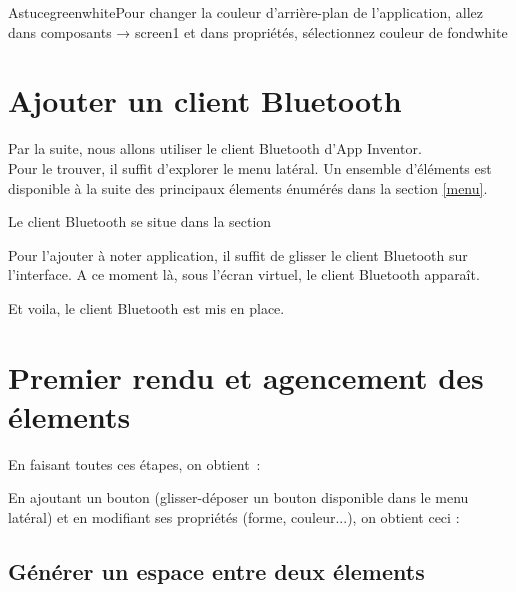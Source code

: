 \begin{messageBox}{Astuce}{green}{white}{Pour changer la couleur d'arrière-plan de l'application, allez dans composants → screen1 et dans propriétés, sélectionnez couleur de fond}{white}
\end{messageBox}

\section{Ajouter un client Bluetooth} \label{bluetooth_install}

Par la suite, nous allons utiliser le client Bluetooth d'App Inventor. \\
Pour le trouver, il suffit d'explorer le {\color{orange}menu latéral}. Un ensemble d'éléments est disponible à la suite des principaux élements énumérés dans la section \ref{menu}.


Le client Bluetooth se situe dans la section 

Pour l'ajouter à noter application, il suffit de glisser le client Bluetooth sur l'{\color{blue}interface}.
A ce moment là, sous l'écran virtuel, le client Bluetooth apparaît.


Et voila, le client Bluetooth est mis en place.

\section{Premier rendu et agencement des élements}

En faisant toutes ces étapes, on obtient : 


En ajoutant un bouton (glisser-déposer un bouton disponible dans le menu latéral) et en modifiant ses propriétés (forme, couleur...), on obtient ceci : 


\subsection{Générer un espace entre deux élements}

